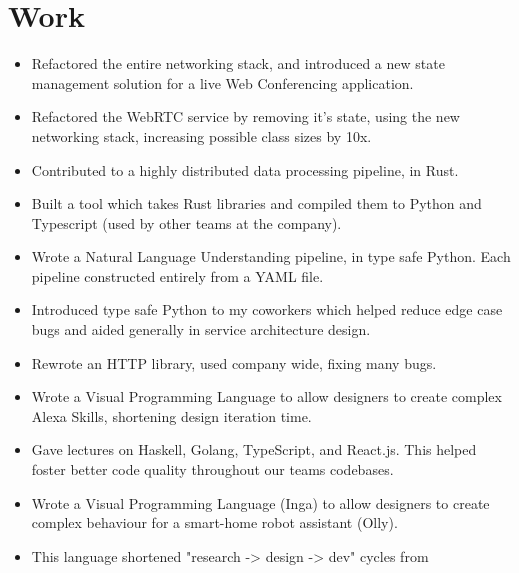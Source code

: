 \documentclass{jcgcv}
\begin{document}
\begin{column}
  \section{Work}
  \begin{itemize}\setlength\itemsep{0.25em}
    \item Refactored the entire networking stack, and introduced a new state
          management solution for a live Web Conferencing application.
    \item Refactored the WebRTC service by removing it's state, using the
          new networking stack, increasing possible class sizes by 10x.
    \item Contributed to a highly distributed data processing pipeline, in Rust.
    \item Built a tool which takes Rust libraries and compiled them to Python
          and Typescript (used by other teams at the company).
  \end{itemize}
  \vgap
  \begin{itemize}\setlength\itemsep{0.25em}
    \item Wrote a Natural Language Understanding pipeline, in type safe
          Python. Each pipeline constructed entirely from a YAML file.
    \item Introduced type safe Python to my coworkers which helped reduce
          edge case bugs and aided generally in service architecture design.
    \item Rewrote an HTTP library, used company wide, fixing many bugs.
    \item Wrote a Visual Programming Language to allow designers to create
          complex Alexa Skills, shortening design iteration time.
    \item Gave lectures on Haskell, Golang, TypeScript, and React.js. This
          helped foster better code quality throughout our teams codebases.
  \end{itemize}
  \vgap
  \begin{itemize}\setlength\itemsep{0.25em}
    \item Wrote a Visual Programming Language (Inga) to allow designers to
          create complex behaviour for a smart-home robot assistant (Olly).
    \item This language shortened "research -> design -> dev" cycles from

\end{itemize}
\end{column}
\end{document}

